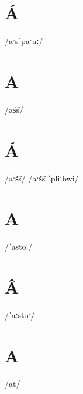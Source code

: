 \documentclass[10pt,a4paper,twoside]{book}
\begin{document}
\section*{Á}

\begin{multicols}{3}
 {/aˑsˈpaˑuː/} {}
\end{multicols}

\section*{A}

\begin{multicols}{3}
 {/as͡s/} {}
\end{multicols}

\section*{Á}

\begin{multicols}{3}
 {/aˑs͡s/} {}
 {/aˑs͡s ˈpliːbwi/} {}
\end{multicols}

\section*{A}

\begin{multicols}{3}
 {/ˈastoː/} {}
\end{multicols}

\section*{Â}

\begin{multicols}{3}
 {/ˈaːstoˑ/} {}
\end{multicols}

\section*{A}

\begin{multicols}{3}
 {/at/} {}
\end{multicols}
\end{document}
